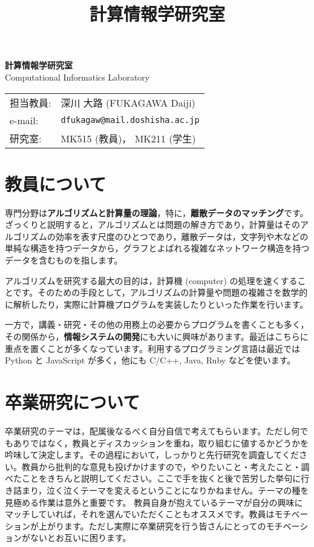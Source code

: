 \documentclass[uplatex,jis2004,a4paper,11pt]{jsarticle}
\title{計算情報学研究室}
\date{}
\renewcommand{\emph}[1]{\textbf{#1}}
\begin{document}
\begin{minipage}[t]{.45\textwidth}
\noindent
{\LARGE\bfseries{} 計算情報学研究室}\\
\hspace{.4cm} Computational Informatics Laboratory
\end{minipage}
\begin{minipage}[t]{.45\textwidth}
\begin{tabular}{l@{ }l}
担当教員: & 深川 大路 (FUKAGAWA Daiji) \\
e-mail: & \texttt{dfukagaw@mail.doshisha.ac.jp} \\
研究室: & MK515 (教員)， MK211 (学生)
\end{tabular}
\end{minipage}


\section{教員について}

専門分野は\emph{アルゴリズムと計算量の理論}，特に，\emph{離散データのマッチング}です。
ざっくりと説明すると，アルゴリズムとは問題の解き方であり，計算量はそのアルゴリズムの効率を表す尺度のひとつであり，離散データは，文字列や木などの単純な構造を持つデータから，グラフとよばれる複雑なネットワーク構造を持つデータを含むものを指します。

アルゴリズムを研究する最大の目的は，計算機 (computer) の処理を速くすることです。そのための手段として，アルゴリズムの計算量や問題の複雑さを数学的に解析したり，実際に計算機プログラムを実装したりといった作業を行います。

一方で，講義・研究・その他の用務上の必要からプログラムを書くことも多く，その関係から，\emph{情報システムの開発}にも大いに興味があります。最近はこちらに重点を置くことが多くなっています。利用するプログラミング言語は最近では Python と JavaScript が多く，他にも C/C++, Java, Ruby などを使います。

\section{卒業研究について}

卒業研究のテーマは，配属後なるべく自分自信で考えてもらいます。ただし何でもありではなく，教員とディスカッションを重ね，取り組むに値するかどうかを吟味して決定します。その過程において，しっかりと先行研究を調査してください。教員から批判的な意見も投げかけますので，やりたいこと・考えたこと・調べたことをきちんと説明してください。ここで手を抜くと後で苦労した挙句に行き詰まり，泣く泣くテーマを変えるということになりかねません。テーマの種を見極める作業は意外と重要です。
教員自身が抱えているテーマが自分の興味にマッチしていれば，それを選んでいただくこともオススメです。教員はモチベーションが上がります。ただし実際に卒業研究を行う皆さんにとってのモチベーションがないとお互いに困ります。
\end{document}
